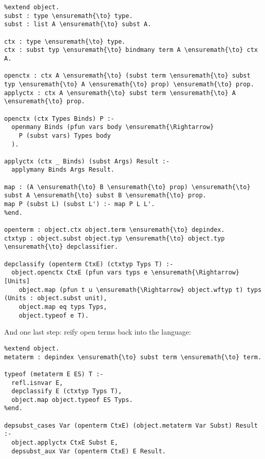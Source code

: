 \begin{verbatim}
%extend object.
subst : type \ensuremath{\to} type.
subst : list A \ensuremath{\to} subst A.

ctx : type \ensuremath{\to} type.
ctx : subst typ \ensuremath{\to} bindmany term A \ensuremath{\to} ctx A.

openctx : ctx A \ensuremath{\to} (subst term \ensuremath{\to} subst typ \ensuremath{\to} A \ensuremath{\to} prop) \ensuremath{\to} prop.
applyctx : ctx A \ensuremath{\to} subst term \ensuremath{\to} A \ensuremath{\to} prop.

openctx (ctx Types Binds) P :-
  openmany Binds (pfun vars body \ensuremath{\Rightarrow}
    P (subst vars) Types body
  ).

applyctx (ctx _ Binds) (subst Args) Result :-
  applymany Binds Args Result.

map : (A \ensuremath{\to} B \ensuremath{\to} prop) \ensuremath{\to} subst A \ensuremath{\to} subst B \ensuremath{\to} prop.
map P (subst L) (subst L') :- map P L L'.
%end.

openterm : object.ctx object.term \ensuremath{\to} depindex.
ctxtyp : object.subst object.typ \ensuremath{\to} object.typ \ensuremath{\to} depclassifier.

depclassify (openterm CtxE) (ctxtyp Typs T) :-
  object.openctx CtxE (pfun vars typs e \ensuremath{\Rightarrow} [Units]
    object.map (pfun t u \ensuremath{\Rightarrow} object.wftyp t) typs (Units : object.subst unit),
    object.map eq typs Typs,
    object.typeof e T).
\end{verbatim}

And one last step: reify open terms back into the language:

\begin{verbatim}
%extend object.
metaterm : depindex \ensuremath{\to} subst term \ensuremath{\to} term.

typeof (metaterm E ES) T :-
  refl.isnvar E,
  depclassify E (ctxtyp Typs T),
  object.map object.typeof ES Typs.
%end.

depsubst_cases Var (openterm CtxE) (object.metaterm Var Subst) Result :-
  object.applyctx CtxE Subst E,
  depsubst_aux Var (openterm CtxE) E Result.
\end{verbatim}

